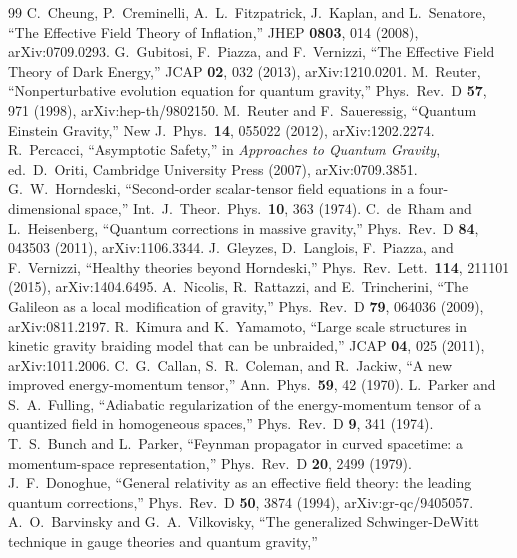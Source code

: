 \documentclass[12pt,a4paper]{article}
\begin{document}
\begin{thebibliography}{99}
  C.~Cheung, P.~Creminelli, A.~L.~Fitzpatrick, J.~Kaplan, and L.~Senatore,
  ``The Effective Field Theory of Inflation,''
  JHEP \textbf{0803}, 014 (2008), arXiv:0709.0293.
  G.~Gubitosi, F.~Piazza, and F.~Vernizzi,
  ``The Effective Field Theory of Dark Energy,''
  JCAP \textbf{02}, 032 (2013), arXiv:1210.0201.
  M.~Reuter,
  ``Nonperturbative evolution equation for quantum gravity,''
  Phys.\ Rev.\ D \textbf{57}, 971 (1998), arXiv:hep-th/9802150.
  M.~Reuter and F.~Saueressig,
  ``Quantum Einstein Gravity,''
  New J.\ Phys.\ \textbf{14}, 055022 (2012), arXiv:1202.2274.
  R.~Percacci,
  ``Asymptotic Safety,''
  in \textit{Approaches to Quantum Gravity}, ed.\ D.~Oriti,
  Cambridge University Press (2007), arXiv:0709.3851.
  G.~W.~Horndeski,
  ``Second-order scalar-tensor field equations in a four-dimensional space,''
  Int.\ J.\ Theor.\ Phys.\ \textbf{10}, 363 (1974).
  C.~de~Rham and L.~Heisenberg,
  ``Quantum corrections in massive gravity,''
  Phys.\ Rev.\ D \textbf{84}, 043503 (2011), arXiv:1106.3344.
  J.~Gleyzes, D.~Langlois, F.~Piazza, and F.~Vernizzi,
  ``Healthy theories beyond Horndeski,''
  Phys.\ Rev.\ Lett.\ \textbf{114}, 211101 (2015), arXiv:1404.6495.
  A.~Nicolis, R.~Rattazzi, and E.~Trincherini,
  ``The Galileon as a local modification of gravity,''
  Phys.\ Rev.\ D \textbf{79}, 064036 (2009), arXiv:0811.2197.
  R.~Kimura and K.~Yamamoto,
  ``Large scale structures in kinetic gravity braiding model
    that can be unbraided,''
  JCAP \textbf{04}, 025 (2011), arXiv:1011.2006.
  C.~G.~Callan, S.~R.~Coleman, and R.~Jackiw,
  ``A new improved energy-momentum tensor,''
  Ann.\ Phys.\ \textbf{59}, 42 (1970).
  L.~Parker and S.~A.~Fulling,
  ``Adiabatic regularization of the energy-momentum tensor of a quantized
    field in homogeneous spaces,''
  Phys.\ Rev.\ D \textbf{9}, 341 (1974).
  T.~S.~Bunch and L.~Parker,
  ``Feynman propagator in curved spacetime: a momentum-space representation,''
  Phys.\ Rev.\ D \textbf{20}, 2499 (1979).
  J.~F.~Donoghue,
  ``General relativity as an effective field theory: the leading quantum corrections,''
  Phys.\ Rev.\ D \textbf{50}, 3874 (1994), arXiv:gr-qc/9405057.
  A.~O.~Barvinsky and G.~A.~Vilkovisky,
  ``The generalized Schwinger-DeWitt technique in gauge theories and quantum gravity,''

\end{thebibliography}
\end{document}
